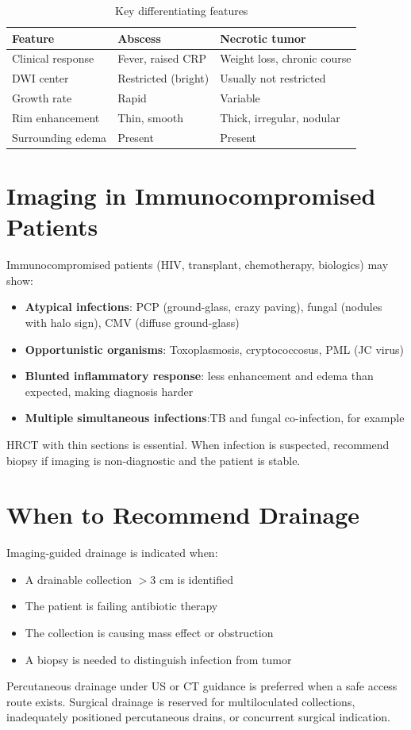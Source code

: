 \begin{table}[h]
\centering
\caption{Key differentiating features}
\begin{tabular}{|l|l|l|}
\hline
\textbf{Feature} & \textbf{Abscess} & \textbf{Necrotic tumor} \\
\hline
Clinical response & Fever, raised CRP & Weight loss, chronic course \\
DWI center & Restricted (bright) & Usually not restricted \\
Growth rate & Rapid & Variable \\
Rim enhancement & Thin, smooth & Thick, irregular, nodular \\
Surrounding edema & Present & Present \\
\hline
\end{tabular}
\end{table}

\section{Imaging in Immunocompromised Patients}
Immunocompromised patients (HIV, transplant, chemotherapy, biologics) may show:
\begin{itemize}
  \item \textbf{Atypical infections}: PCP (ground-glass, crazy paving), fungal (nodules with halo sign), CMV (diffuse ground-glass)
  \item \textbf{Opportunistic organisms}: Toxoplasmosis, cryptococcosus, PML (JC virus)
  \item \textbf{Blunted inflammatory response}: less enhancement and edema than expected, making diagnosis harder
  \item \textbf{Multiple simultaneous infections}:TB and fungal co-infection, for example
\end{itemize}

HRCT with thin sections is essential. When infection is suspected, recommend biopsy if imaging is non-diagnostic and the patient is stable.

\section{When to Recommend Drainage}
Imaging-guided drainage is indicated when:
\begin{itemize}
  \item A drainable collection $>$3 cm is identified
  \item The patient is failing antibiotic therapy
  \item The collection is causing mass effect or obstruction
  \item A biopsy is needed to distinguish infection from tumor
\end{itemize}
Percutaneous drainage under US or CT guidance is preferred when a safe access route exists. Surgical drainage is reserved for multiloculated collections, inadequately positioned percutaneous drains, or concurrent surgical indication.

